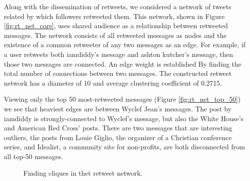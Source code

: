 \documentclass[a4paper, 11pt, titlepage]{article}
\begin{document}
Along with the dissemination of retweets, we considered a network of tweets related by which followers retweeted them.  This network, shown in Figure \ref{fig:rt_net_core}, uses shared audience as a relationship between retweeted messages.  The network consists of all retweeted messages as nodes and the existence of a common retweeter of any two messages as an edge.  For example, if a user retweets both iamdiddy's message and ashton kutcher's message, then those two messages are connected.  An edge weight is established By finding the total number of connections between two messages.  The constructed retweet network has a diameter of 10 and average clustering coefficient of 0.2715.

Viewing only the top 50 most-retweeted messages (Figure \ref{fig:rt_net_top_50}) we see that heaviest edges are between Wyclef Jean's messages.  The post by iamdiddy is strongly-connected to Wyclef's message, but also the White House's and American Red Cross' posts.  There are two messages that are interesting outliers, the posts from Louie Giglio, the organizer of a Christian conference series, and Idealist, a community site for non-profits, are both disconnected from all top-50 messages.

\begin{figure}[h]
\centering
{}
\quad
{}
\caption{Finding cliques in thet retweet network.}
\end{figure}
\end{document}
